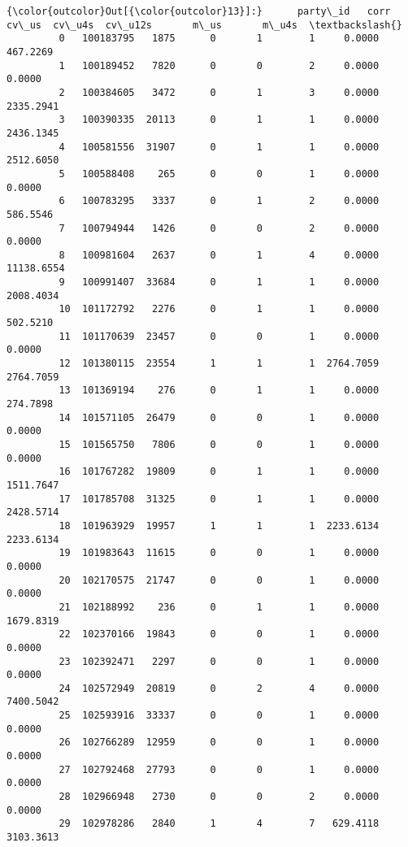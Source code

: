 \documentclass[11pt]{article}
\begin{document}
\begin{Verbatim}[commandchars=\\\{\}]
{\color{outcolor}Out[{\color{outcolor}13}]:}      party\_id   corr  cv\_us  cv\_u4s  cv\_u12s       m\_us       m\_u4s  \textbackslash{}
         0   100183795   1875      0       1        1     0.0000    467.2269   
         1   100189452   7820      0       0        2     0.0000      0.0000   
         2   100384605   3472      0       1        3     0.0000   2335.2941   
         3   100390335  20113      0       1        1     0.0000   2436.1345   
         4   100581556  31907      0       1        1     0.0000   2512.6050   
         5   100588408    265      0       0        1     0.0000      0.0000   
         6   100783295   3337      0       1        2     0.0000    586.5546   
         7   100794944   1426      0       0        2     0.0000      0.0000   
         8   100981604   2637      0       1        4     0.0000  11138.6554   
         9   100991407  33684      0       1        1     0.0000   2008.4034   
         10  101172792   2276      0       1        1     0.0000    502.5210   
         11  101170639  23457      0       0        1     0.0000      0.0000   
         12  101380115  23554      1       1        1  2764.7059   2764.7059   
         13  101369194    276      0       1        1     0.0000    274.7898   
         14  101571105  26479      0       0        1     0.0000      0.0000   
         15  101565750   7806      0       0        1     0.0000      0.0000   
         16  101767282  19809      0       1        1     0.0000   1511.7647   
         17  101785708  31325      0       1        1     0.0000   2428.5714   
         18  101963929  19957      1       1        1  2233.6134   2233.6134   
         19  101983643  11615      0       0        1     0.0000      0.0000   
         20  102170575  21747      0       0        1     0.0000      0.0000   
         21  102188992    236      0       1        1     0.0000   1679.8319   
         22  102370166  19843      0       0        1     0.0000      0.0000   
         23  102392471   2297      0       0        1     0.0000      0.0000   
         24  102572949  20819      0       2        4     0.0000   7400.5042   
         25  102593916  33337      0       0        1     0.0000      0.0000   
         26  102766289  12959      0       0        1     0.0000      0.0000   
         27  102792468  27793      0       0        1     0.0000      0.0000   
         28  102966948   2730      0       0        2     0.0000      0.0000   
         29  102978286   2840      1       4        7   629.4118   3103.3613   

\end{Verbatim}
\end{document}
